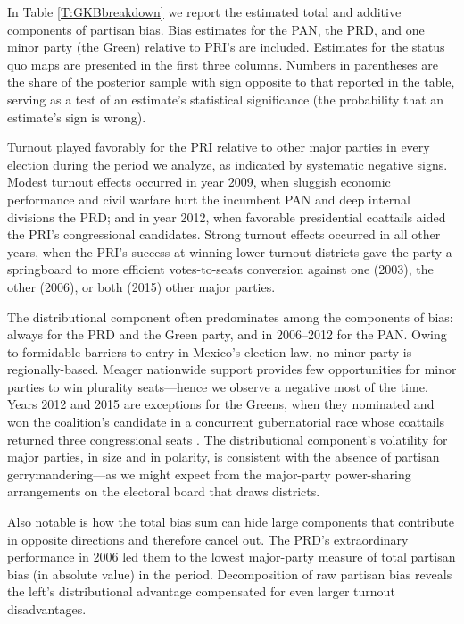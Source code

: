 \documentclass[letter,12pt]{article}
\begin{document}
{In Table \ref{T:GKBbreakdown} we report the estimated total and additive components of partisan bias. Bias estimates for the PAN, the PRD, and one minor party (the Green) relative to PRI's are included. Estimates for the status quo maps are presented in the first three columns. Numbers in parentheses are the share of the posterior sample with sign opposite to that reported in the table, serving as a test of an estimate's statistical significance (the probability that an estimate's sign is wrong). 

Turnout played favorably for the PRI relative to other major parties in every election during the period we analyze, as indicated by systematic negative signs. Modest turnout effects occurred in year 2009, when sluggish economic performance and civil warfare hurt the incumbent PAN and deep internal divisions the PRD; and in year 2012, when favorable presidential coattails aided the PRI's congressional candidates. Strong turnout effects occurred in all other years, when the PRI's success at winning lower-turnout districts gave the party a springboard to more efficient votes-to-seats conversion against one (2003), the other (2006), or both (2015) other major parties. 

The distributional component often predominates among the components of bias: always for the PRD and the Green party, and in 2006--2012 for the PAN. Owing to formidable barriers to entry in Mexico's election law, no minor party is regionally-based. Meager nationwide support provides few opportunities for minor parties to win plurality seats---hence we observe a negative most of the time. Years 2012 and 2015 are exceptions for the Greens, when they nominated and won the coalition's candidate in a concurrent gubernatorial race whose coattails returned three congressional seats \citep{magar.gubCoatMx.2012}. The distributional component's volatility for major parties, in size and in polarity, is consistent with the absence of partisan gerrymandering---as we might expect from the major-party power-sharing arrangements on the electoral board that draws districts. 

Also notable is how the total bias sum can hide large components that contribute in opposite directions and therefore cancel out. The PRD's extraordinary performance in 2006 led them to the lowest major-party measure of total partisan bias (in absolute value) in the period. Decomposition of raw partisan bias reveals the left's distributional advantage compensated for even larger turnout disadvantages. 

}
\end{document}
